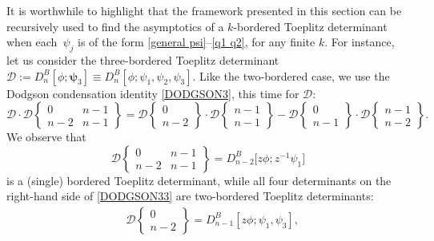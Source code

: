 \documentclass[pdftex]{sigma}
\numberwithin{equation}{section}
\begin{document}
\begin{Remark}\label{remark multi-bordered} \normalfont
It is worthwhile to highlight that the framework presented in this section can be recursively used to find the asymptotics of a $k$-bordered Toeplitz determinant when each~$\psi_j$ is of the form \eqref{general psi}--\eqref{q1 q2}, for any finite $k$. For instance, let us consider the three-bordered Toeplitz determinant
$
\mathcal{D}:= D^B_n[\phi;\boldsymbol{\psi}_3] \equiv D^B_n[\phi;\psi_1,\psi_2,\psi_3]$.
			Like the two-bordered case, we use the Dodgson condensation identity \eqref{DODGSON3}, this time for $\mathcal{D}$:
			\begin{equation}\label{DODGSON33}
				\mathcal{D} \cdot \mathcal{D}\left\lbrace \begin{matrix} 0 & n-1 \\ n-2& n-1 \end{matrix} \right\rbrace = \mathcal{D}\left\lbrace \begin{matrix} 0 \\ n-2 \end{matrix} \right\rbrace \cdot \mathcal{D}\left\lbrace \begin{matrix} n-1 \\ n-1 \end{matrix} \right\rbrace - \mathcal{D}\left\lbrace \begin{matrix} 0 \\ n-1 \end{matrix} \right\rbrace \cdot \mathcal{D}\left\lbrace \begin{matrix} n-1 \\ n-2 \end{matrix} \right\rbrace.
			\end{equation}
			We observe that
			\begin{equation*}
				\mathcal{D}\left\lbrace \begin{matrix} 0 & n-1 \\ n-2& n-1 \end{matrix} \right\rbrace = D^B_{n-2}\big[z\phi;z^{-1}\psi_1\big]
			\end{equation*}
			is a (single) bordered Toeplitz determinant, while all four determinants on the right-hand side of \eqref{DODGSON33} are two-bordered Toeplitz determinants:
			\begin{align}
				&\mathcal{D}\left\lbrace \begin{matrix} 0 \\ n-2 \end{matrix} \right\rbrace = D^B_{n-1}[z\phi;\psi_1,\psi_3], \label{E11} \\

\end{align}
\end{Remark}
\end{document}
